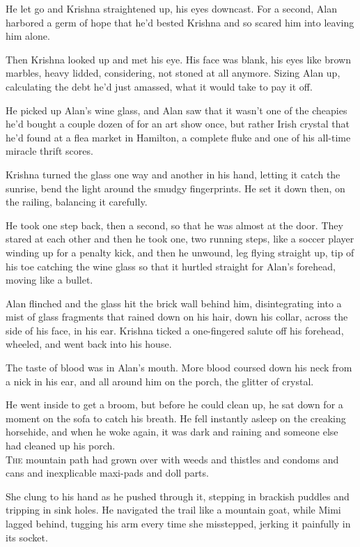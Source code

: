 \documentclass{article}
\begin{document}
He let go and Krishna straightened up, his eyes downcast.  For a
second, Alan harbored a germ of hope that he'd bested Krishna and so
scared him into leaving him alone.

Then Krishna looked up and met his eye.  His face was blank, his eyes
like brown marbles, heavy lidded, considering, not stoned at all
anymore.  Sizing Alan up, calculating the debt he'd just amassed, what
it would take to pay it off.

He picked up Alan's wine glass, and Alan saw that it wasn't one of the
cheapies he'd bought a couple dozen of for an art show once, but
rather Irish crystal that he'd found at a flea market in Hamilton, a
complete fluke and one of his all-time miracle thrift scores.

Krishna turned the glass one way and another in his hand, letting it
catch the sunrise, bend the light around the smudgy fingerprints.  He
set it down then, on the railing, balancing it carefully.

He took one step back, then a second, so that he was almost at the
door.  They stared at each other and then he took one, two running
steps, like a soccer player winding up for a penalty kick, and then he
unwound, leg flying straight up, tip of his toe catching the wine
glass so that it hurtled straight for Alan's forehead, moving like a
bullet.

Alan flinched and the glass hit the brick wall behind him,
disintegrating into a mist of glass fragments that rained down on his
hair, down his collar, across the side of his face, in his ear. 
Krishna ticked a one-fingered salute off his forehead, wheeled, and
went back into his house.

The taste of blood was in Alan's mouth.  More blood coursed down his
neck from a nick in his ear, and all around him on the porch, the
glitter of crystal.

He went inside to get a broom, but before he could clean up, he sat
down for a moment on the sofa to catch his breath.  He fell instantly
asleep on the creaking horsehide, and when he woke again, it was dark
and raining and someone else had cleaned up his porch.
\\
\lettrine[lines=3, lhang=.5, nindent=0pt, findent=2pt]{T}{he} mountain path had grown over with weeds and thistles and condoms
and cans and inexplicable maxi-pads and doll parts.

She clung to his hand as he pushed through it, stepping in brackish
puddles and tripping in sink holes.  He navigated the trail like a
mountain goat, while Mimi lagged behind, tugging his arm every time
she misstepped, jerking it painfully in its socket.
\end{document}
